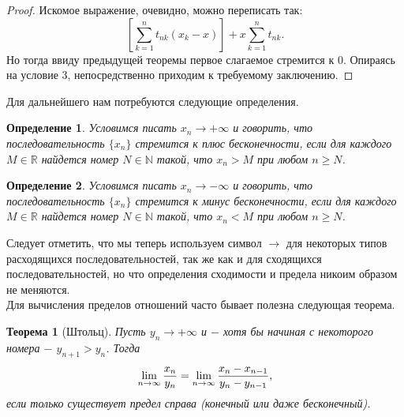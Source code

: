 \documentclass{article}
\newtheorem{theorem}{Теорема}[section]
\newtheorem{definition}{Определение}[section]
\begin{document}
\begin{proof}
Искомое выражение, очевидно, можно переписать так:
\[
\left[\sum\limits_{k = 1}^{n} {t_{nk}(x_k - x)}\right] + x\sum\limits_{k = 1}^{n} {t_{nk}}.
\]
Но тогда ввиду предыдущей теоремы первое слагаемое стремится к \(0\). Опираясь на условие \(\textit{3}\), непосредственно приходим к требуемому заключению.
\end{proof}

Для дальнейшего нам потребуются следующие определения.

\begin{definition}
Условимся писать \(x_n \to + \infty\) и говорить, что последовательность \(\{x_n\}\) стремится к плюс бесконечности, если для каждого \(M \in \mathbb{R}\) найдется номер \(N \in \mathbb{N}\) такой, что \(x_n > M\) при любом \(n \geq N\).
\end{definition}

\begin{definition}
Условимся писать \(x_n \to - \infty\) и говорить, что последовательность \(\{x_n\}\) стремится к минус бесконечности, если для каждого \(M \in \mathbb{R}\) найдется номер \(N \in \mathbb{N}\) такой, что \(x_n < M\) при любом \(n \geq N\).
\end{definition}

Следует отметить, что мы теперь используем символ \(\to\) для некоторых типов расходящихся последовательностей, так же как и для сходящихся последовательностей, но что определения сходимости и предела никоим образом не меняются.
\\

Для вычисления пределов отношений часто бывает полезна следующая теорема.

\begin{theorem}[Штольц]
Пусть \(y_n \to + \infty\) и \(-\) хотя бы начиная с некоторого номера \(-\) \(y_{n + 1} > y_n\). Тогда
\[
\lim\limits_{n \to \infty}{x_n \over y_n} = \lim\limits_{n \to \infty}{{x_n - x_{n - 1}} \over {y_n - y_{n - 1}}},
\]
если только существует предел справа (конечный или даже бесконечный).
\end{theorem}
\end{document}
